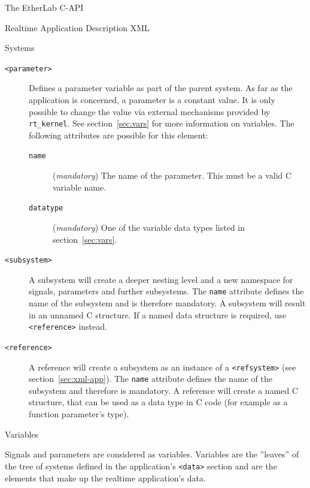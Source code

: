 \begin{ighsec}{The EtherLab C-API}
\begin{ighsec}{Realtime Application Description XML}
\begin{ighsec}{Systems}
\begin{description}
\begin{description}
\end{description}

\item[\small\texttt{<parameter>}] Defines a parameter variable as part of the
parent system. As far as the application is concerned, a parameter is a
constant value. It is only possible to change the value via external
mechanisms provided by \texttt{rt\_kernel}. See section~\ref{sec:vars} for
more information on variables. The following attributes are possible for this
element:

\begin{description}

\item[\small\texttt{name}] (\textit{mandatory}) The name of the parameter.
This must be a valid C variable name.

\item[\small\texttt{datatype}] (\textit{mandatory}) One of the variable data
types listed in section~\ref{sec:vars}.

\end{description}

\item[\small\texttt{<subsystem>}] A subsystem will create a deeper nesting
level and a new namespace for signals, parameters and further subsystems. The
\texttt{name} attribute defines the name of the subsystem and is therefore
mandatory. A subsystem will result in an unnamed C structure. If a named data
structure is required, use \texttt{<reference>} instead.

\item[\small\texttt{<reference>}] A reference will create a subsystem as an
instance of a \texttt{<refsystem>} (see section~\ref{sec:xml-app}). The
\texttt{name} attribute defines the name of the subsystem and therefore is
mandatory. A reference will create a named C structure, that can be used as a
data type in C code (for example as a function parameter's type).

\end{description}

\end{ighsec}

\begin{ighsec}{Variables}
\label{sec:vars}

Signals and parameters are considered as variables. Variables are the
''leaves'' of the tree of systems defined in the application's \texttt{<data>}
section and are the elements that make up the realtime application's data.


\end{ighsec}
\end{ighsec}
\end{ighsec}

